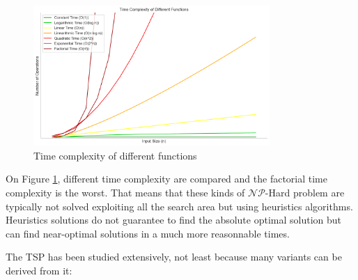 \begin{figure}[!ht]
    \centering
    \includegraphics[width=0.8\textwidth]{Figures/NP-hardness - time complexity.png}
    \caption{Time complexity of different functions \cite{time_complexity}}
    \label{fig:time_complexity_comparisons}
\end{figure}

On Figure \ref{fig:time_complexity_comparisons}, different time complexity are compared and the factorial time complexity is the worst. That means that these kinds of $\mathcal{NP}$-Hard problem are typically not solved exploiting all the search area but using heuristics algorithms. Heuristics solutions do not guarantee to find the absolute optimal solution but can find near-optimal solutions in a much more reasonnable times.

The TSP has been studied extensively, not least because many variants can be derived from it:

